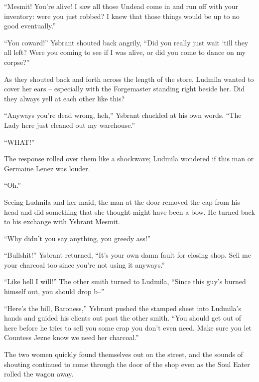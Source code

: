  

“Mesmit! You’re alive! I saw all those Undead come in and run off with your inventory: were you just robbed? I knew that those things would be up to no good eventually.”

 

“You coward!” Ysbrant shouted back angrily, “Did you really just wait ‘till they all left? Were you coming to see if I was alive, or did you come to dance on my corpse?”

 

As they shouted back and forth across the length of the store, Ludmila wanted to cover her ears – especially with the Forgemaster standing right beside her. Did they always yell at each other like this?

 

“Anyways you’re dead wrong, heh,” Ysbrant chuckled at his own words. “The Lady here just cleaned out my warehouse.”

 

“WHAT!”

 

The response rolled over them like a shockwave; Ludmila wondered if this man or Germaine Lenez was louder.

 

“Oh.”

 

Seeing Ludmila and her maid, the man at the door removed the cap from his head and did something that she thought might have been a bow. He turned back to his exchange with Ysbrant Mesmit.

 

“Why didn’t you say anything, you greedy ass!”

 

“Bullshit!” Ysbrant returned, “It’s your own damn fault for closing shop. Sell me your charcoal too since you’re not using it anyways.”

 

“Like hell I will!” The other smith turned to Ludmila, “Since this guy’s burned himself out, you should drop b–”

 

“Here’s the bill, Baroness,” Ysbrant pushed the stamped sheet into Ludmila’s hands and guided his clients out past the other smith. “You should get out of here before he tries to sell you some crap you don’t even need. Make sure you let Countess Jezne know we need her charcoal.”

 

The two women quickly found themselves out on the street, and the sounds of shouting continued to come through the door of the shop even as the Soul Eater rolled the wagon away.